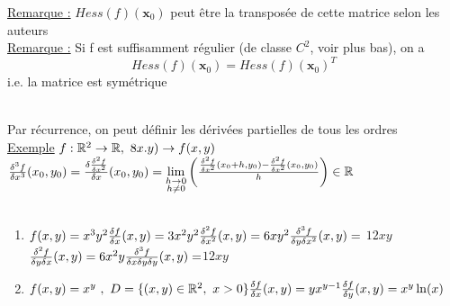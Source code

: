 \documentclass[12pt,a4paper]{article}
\begin{document}
\begin{boite}
	\uline{Remarque :} $Hess(f)(\textbf{x}_0)$ peut être la transposée de cette matrice selon les auteurs\\
	\uline{Remarque :} Si f est suffisamment régulier (de classe $C^2$, voir plus bas), on a 
\begin{equation*}
	Hess(f)(\textbf{x}_0) = Hess(f)(\textbf{x}_0)^T
\end{equation*}
i.e. la matrice est symétrique
\end{boite}
\\
Par récurrence, on peut définir les dérivées partielles de tous les ordres\\
\underline{Exemple} $f: \mathbb{R}^2 \to \mathbb{R},\ 8x.y) \to f(x,y)$\\
$\frac{\delta^3 f}{\delta x^3}(x_0,y_0) = \frac{\delta \frac{\delta^2 f}{\delta x^2}}{\delta x}(x_0,y_0) = \lim\limits_{\substack{h\to 0 \\ h\neq 0}}\left(\frac{\frac{\delta^2 f}{\delta x^2} (x_0 + h,y_0) - \frac{\delta^2f}{\delta x^2}(x_0,y_0)}{h}\right) \in \mathbb{R}$\\
\\
\begin{multicols}{2}
\begin{enumerate}
	\item 	$f(x,y) = x^3y^2\\
			\frac{\delta f}{\delta x}(x,y) = 3x^2y^2\\
			\frac{\delta^2 f}{\delta x^2}(x,y) = 6xy^2\\
			\frac{\delta^3 f}{\delta y\delta x^2}(x,y) =$ {$12xy$}\\
			$\frac{\delta^2 f}{\delta y\delta x}(x,y) = 6x^2y\\
			\frac{\delta^3f}{\delta x \delta y \delta y}(x,y) = ${$12xy$}
			\columnbreak
			
	\item 	$f(x,y) = x^y \ , \ D = \{(x,y) \in \mathbb{R}^2,\ x>0\}\\
			\frac{\delta f}{\delta x}(x,y) = yx^{y-1}\\
			\frac{\delta f}{\delta y}(x,y) = x^y\ln(x)$
		\end{enumerate}
			\end{multicols}
\end{document}
